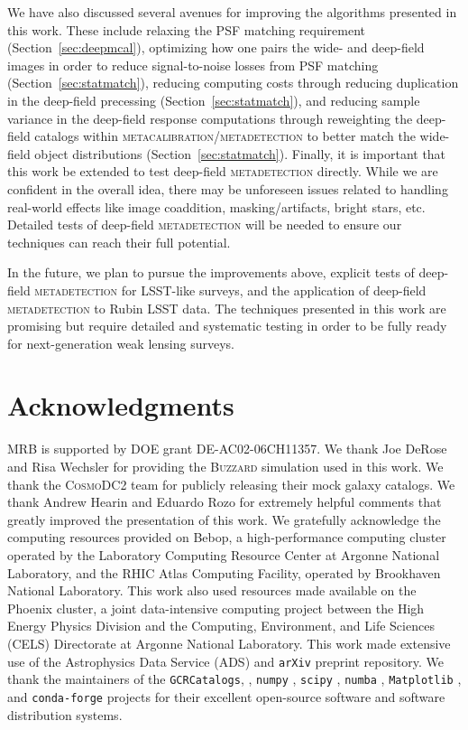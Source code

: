 \documentclass[twocolumn]{openjournal}
\makeatletter
\newcommand{\mdet}{\textsc{metadetection}\@\xspace}
\newcommand{\mcal}{\textsc{metacalibration}\@\xspace}
\newcommand{\cosmodctwo}{\textsc{CosmoDC2}\@\xspace}
\newcommand{\buzzard}{\textsc{Buzzard}\@\xspace}
\makeatother
\begin{document}
We have also discussed several avenues for improving the algorithms presented in this
work. These include relaxing the PSF matching requirement (Section~\ref{sec:deepmcal}),
optimizing how one pairs the wide- and deep-field images in order to reduce
signal-to-noise losses from PSF matching (Section~\ref{sec:statmatch}), reducing
computing costs through reducing duplication in the deep-field precessing
(Section~\ref{sec:statmatch}), and reducing sample variance in the deep-field response
computations through reweighting the deep-field catalogs within \mcal/\mdet to better
match the wide-field object distributions (Section~\ref{sec:statmatch}).
Finally, it is important that this work be extended to test deep-field \mdet directly.
While we are confident in the overall idea, there may be unforeseen issues related to
handling real-world effects like image coaddition, masking/artifacts, bright stars, etc.
Detailed tests of deep-field \mdet will be needed to ensure our techniques can reach
their full potential.

In the future, we plan to pursue the improvements above, explicit tests of deep-field
\mdet for LSST-like surveys, and the application of deep-field \mdet to Rubin LSST data.
The techniques presented in this work are promising but require detailed and systematic
testing in order to be fully ready for next-generation weak lensing surveys.

\section*{Acknowledgments}

MRB is supported by DOE grant DE-AC02-06CH11357. We thank Joe DeRose and Risa Wechsler
for providing the \buzzard simulation used in this work. We thank the \cosmodctwo team
for publicly releasing their mock galaxy catalogs. We thank Andrew Hearin and Eduardo
Rozo for extremely helpful comments that greatly improved the presentation of this work.
We gratefully acknowledge the computing resources provided on Bebop, a high-performance
computing cluster operated by the Laboratory Computing Resource Center at Argonne
National Laboratory, and the RHIC Atlas Computing Facility, operated by Brookhaven
National Laboratory. This work also used resources made available on the Phoenix
cluster, a joint data-intensive computing project between the High Energy Physics
Division and the Computing, Environment, and Life Sciences (CELS) Directorate at Argonne
National Laboratory. This work made extensive use of the Astrophysics Data Service (ADS)
and \texttt{arXiv} preprint repository. We thank the maintainers of the
\texttt{GCRCatalogs}, \citep{gcrcatalogs}, \texttt{numpy} \citep{numpy}, \texttt{scipy}
\citep{scipy}, \texttt{numba} \citep{numba}, \texttt{Matplotlib} \citep{matplotlib}, and
\texttt{conda-forge} \citep{condaforge} projects for their excellent open-source
software and software distribution systems.




\end{document}
